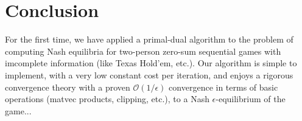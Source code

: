 \documentclass{article} %
\begin{document}

\section{Conclusion}
For the first time, we have applied a primal-dual algorithm to the problem of computing Nash equilibria for two-person zero-sum sequential games with imcomplete information (like Texas Hold'em, etc.). Our algorithm is simple to implement, with a very low constant cost per iteration, and enjoys a rigorous convergence theory with a proven $\mathcal{O}(1/\epsilon)$ convergence in terms of basic operations (matvec products, clipping, etc.), to a Nash $\epsilon$-equilibrium of the game...
\end{document}
